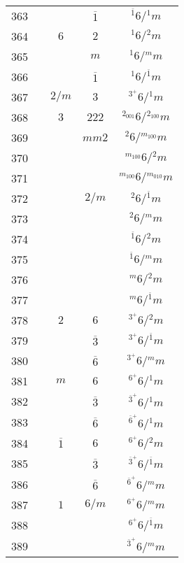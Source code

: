 \begin{longtable}{ccccc}
  363 &  &  & $\overline{1}$ & ${}^{\overline{1}} 6  / {}^{1} m $\\
  364 &  & $6$ & $2$ & ${}^{1} 6  / {}^{2} m $\\
  365 &  &  & $m$ & ${}^{1} 6  / {}^{m} m $\\
  366 &  &  & $\overline{1}$ & ${}^{1} 6  / {}^{\overline{1}} m $\\
  367 &  & $2/m$ & $3$ & ${}^{3^{+}} 6  / {}^{1} m $\\
  368 &  & $3$ & $222$ & ${}^{2_{001}} 6  / {}^{2_{100}} m $\\
  369 &  &  & $mm2$ & ${}^{2} 6  / {}^{m_{100}} m $\\
  370 &  &  &  & ${}^{m_{100}} 6  / {}^{2} m $\\
  371 &  &  &  & ${}^{m_{100}} 6  / {}^{m_{010}} m $\\
  372 &  &  & $2/m$ & ${}^{2} 6  / {}^{\overline{1}} m $\\
  373 &  &  &  & ${}^{2} 6  / {}^{m} m $\\
  374 &  &  &  & ${}^{\overline{1}} 6  / {}^{2} m $\\
  375 &  &  &  & ${}^{\overline{1}} 6  / {}^{m} m $\\
  376 &  &  &  & ${}^{m} 6  / {}^{2} m $\\
  377 &  &  &  & ${}^{m} 6  / {}^{\overline{1}} m $\\
  378 &  & $2$ & $6$ & ${}^{3^{+}} 6  / {}^{2} m $\\
  379 &  &  & $\overline{3}$ & ${}^{3^{+}} 6  / {}^{\overline{1}} m $\\
  380 &  &  & $\overline{6}$ & ${}^{3^{+}} 6  / {}^{m} m $\\
  381 &  & $m$ & $6$ & ${}^{6^{+}} 6  / {}^{1} m $\\
  382 &  &  & $\overline{3}$ & ${}^{\overline{3}^{+}} 6  / {}^{1} m $\\
  383 &  &  & $\overline{6}$ & ${}^{\overline{6}^{+}} 6  / {}^{1} m $\\
  384 &  & $\overline{1}$ & $6$ & ${}^{6^{+}} 6  / {}^{2} m $\\
  385 &  &  & $\overline{3}$ & ${}^{\overline{3}^{+}} 6  / {}^{\overline{1}} m $\\
  386 &  &  & $\overline{6}$ & ${}^{\overline{6}^{+}} 6  / {}^{m} m $\\
  387 &  & $1$ & $6/m$ & ${}^{6^{+}} 6  / {}^{m} m $\\
  388 &  &  &  & ${}^{6^{+}} 6  / {}^{\overline{1}} m $\\
  389 &  &  &  & ${}^{\overline{3}^{+}} 6  / {}^{m} m $\\

\end{longtable}
